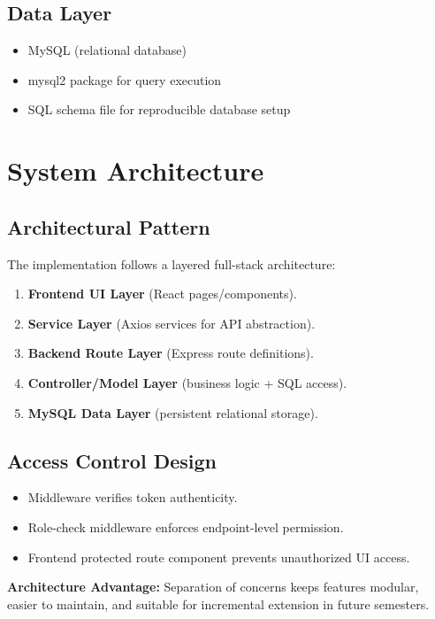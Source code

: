 \documentclass[12pt,a4paper]{article}
\newcommand{\infobox}[1]{
    \vspace{0.4em}
    \noindent\colorbox{SoftBlue}{\parbox{\dimexpr\linewidth-2\fboxsep\relax}{#1}}
    \vspace{0.4em}
}
\begin{document}
\subsection{Data Layer}
\begin{itemize}[leftmargin=1.2cm]
    \item MySQL (relational database)
    \item mysql2 package for query execution
    \item SQL schema file for reproducible database setup
\end{itemize}

\section{System Architecture}
\subsection{Architectural Pattern}
The implementation follows a layered full-stack architecture:
\begin{enumerate}[leftmargin=1.2cm]
    \item \textbf{Frontend UI Layer} (React pages/components).
    \item \textbf{Service Layer} (Axios services for API abstraction).
    \item \textbf{Backend Route Layer} (Express route definitions).
    \item \textbf{Controller/Model Layer} (business logic + SQL access).
    \item \textbf{MySQL Data Layer} (persistent relational storage).
\end{enumerate}

\subsection{Access Control Design}
\begin{itemize}[leftmargin=1.2cm]
    \item Middleware verifies token authenticity.
    \item Role-check middleware enforces endpoint-level permission.
    \item Frontend protected route component prevents unauthorized UI access.
\end{itemize}

\infobox{
\textbf{Architecture Advantage:} Separation of concerns keeps features modular, easier to maintain, and suitable for incremental extension in future semesters.
}
\end{document}

